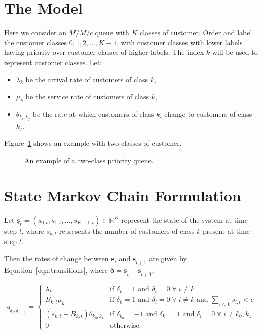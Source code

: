 \documentclass{article}
\begin{document}
\section{The Model}

Here we consider an $M/M/c$ queue with $K$ classes of customer.
Order and label the customer classes $0, 1, 2, \dots, K-1$, with customer
classes with lower labels having priority over customer classes of higher
labels. The index $k$ will be used to represent customer classes.
Let:

\begin{itemize}
  \item $\lambda_k$ be the arrival rate of customers of class $k$,
  \item $\mu_k$ be the service rate of customers of class $k$,
  \item $\theta_{k_i,k_j}$ be the rate at which customers of class $k_i$ change
  to customers of class $k_j$.
\end{itemize}

Figure~\ref{fig:twoclass_example} shows an example with two classes of customer.

\begin{figure}
\begin{center}

\end{center}
\caption{An example of a two-class priority queue.}
\label{fig:twoclass_example}
\end{figure}


\section{State Markov Chain Formulation}
Let
$\underline{\mathbf{s}}_t = (s_{0,t}, s_{1,t}, \dots, s_{K-1,t}) \in \mathbb{N}^K$
represent the state of the system at time step $t$, where $s_{k,t}$ represents
the number of customers of class $k$ present at time step $t$.

Then the rates of change between $\underline{\mathbf{s}}_t$ and
$\underline{\mathbf{s}}_{t+1}$ are given by Equation~\ref{eqn:transitions},
where $\underline{\mathbf{\delta}} = \underline{\mathbf{s}}_t - \underline{\mathbf{s}}_{t+1}$,

\begin{equation}\label{eqn:transitions}
q_{\underline{\mathbf{s}}_t, \underline{\mathbf{s}}_{t+1}} = 
\begin{cases}
\lambda_k & \text{if } \delta_k = 1 \text{ and } \delta_i = 0 \; \forall \; i \neq k \\
B_{k,t} \mu_k & \text{if } \delta_k = 1 \text{ and } \delta_i = 0 \; \forall \; i \neq k \text{ and } \sum_{i < k} s_{i,t} < c \\
(s_{k,t} - B_{k,t}) \theta_{k_0,k_1} & \text{if } \delta_{k_0} = -1 \text{ and } \delta_{k_1} = 1 \text{ and } \delta_i = 0 \; \forall \; i \neq k_0, k_1 \\
0 & \text{otherwise.}
\end{cases}
\end{equation}
\end{document}
